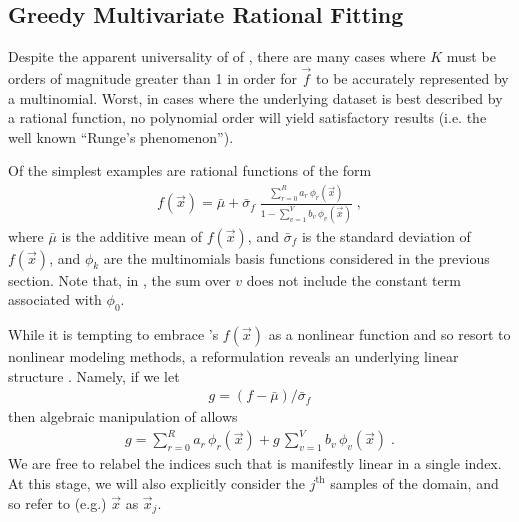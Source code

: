 \documentclass[twocolumn,aps,prd,floatfix,preprintnumbers,a4paper,nofootinbib,
superscriptaddress,10pt]{revtex4-1}
\begin{document}
\subsection{Greedy Multivariate Rational Fitting}
%
%
\par Despite the apparent universality of of , there are many cases where $K$ must be orders of magnitude greater than 1 in order for $\vec{f}$ to be accurately represented by a multinomial.
%
Worst, in cases where the underlying dataset is best described by a rational function, no polynomial order will yield satisfactory results (i.e. the well known ``Runge's phenomenon'').
%
\par Of the simplest examples are rational functions of the form
%
\def\muf{\bar{\mu}}
\def\sif{\bar{\sigma}_f}
\begin{align}
  \label{eq:rat1}
  f(\vec{x}) = \muf + \sif \; \frac{ \sum_{r=0}^{R} a_r \, \phi_{r}(\vec{x}) }{ 1 - \sum_{v=1}^{V} b_v \, \phi_{v}(\vec{x}) } \;,
\end{align}
%
where $\muf$ is the additive mean of $f(\vec{x})$, and $\sif$ is the standard deviation of $f(\vec{x})$, and $\phi_k$ are the multinomials basis functions considered in the previous section.
%
Note that, in , the sum over $v$ does not include the constant term associated with $\phi_0$.
%
\par While it is tempting to embrace 's $f({\vec{x}})$ as a nonlinear function and so resort to nonlinear modeling methods, a reformulation reveals an underlying linear structure \cite{Press:1992:NRC:148286}.
%
Namely, if we let
%
\begin{align}
  g = (f - \muf)/\sif
\end{align}
%
then algebraic manipulation of  allows
%
\begin{align}
  \label{eq:rat2}
  g = \sum_{r=0}^{R} a_r \, \phi_{r}(\vec{x}) + g\, \sum_{v=1}^{V} b_v \, \phi_{v}(\vec{x}) \; .
\end{align}
%
We are free to relabel the indices such that  is manifestly linear in a single index.
%
At this stage, we will also explicitly consider the $j^\mathrm{th}$ samples of the domain, and so refer to (e.g.) $\vec{x}$ as $\vec{x}_j$.
%
%
\end{document}
